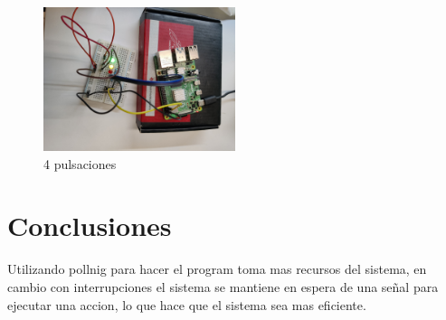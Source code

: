 \documentclass[12pt]{report}
\begin{document}
\begin{figure}[H]
  \centering
  \includegraphics[width=0.5\textwidth]{screenshots/foto4.jpeg}
  \caption{4 pulsaciones}
\end{figure}
\newpage

\chapter{Conclusiones}
Utilizando pollnig para hacer el program toma mas recursos del sistema, en cambio con interrupciones el sistema se mantiene en espera de una señal para ejecutar una accion, lo que hace que el sistema sea mas eficiente.
\newpage

\end{document}
